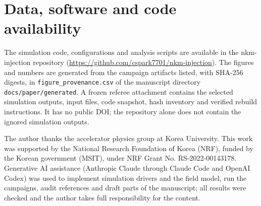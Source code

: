 \documentclass[aps,prab,reprint,amsmath,amssymb,floatfix,longbibliography]{revtex4-2}
\begin{document}
\section*{Data, software and code availability}

{\sloppy The simulation code, configurations and analysis scripts are available in the nkm-injection repository (\url{https://github.com/cspark7701/nkm-injection}). The figures and numbers are generated from the campaign artifacts listed, with SHA-256 digests, in \texttt{figure\_provenance.csv} of the manuscript directory \texttt{docs/\allowbreak paper/\allowbreak generated}. A frozen referee attachment contains the selected simulation outputs, input files, code snapshot, hash inventory and verified rebuild instructions. It has no public DOI; the repository alone does not contain the ignored simulation outputs.\par}

\begin{acknowledgments}

The author thanks the accelerator physics group at Korea University. This work was supported by the National Research Foundation of Korea (NRF), funded by the Korean government (MSIT), under NRF Grant No. RS-2022-00143178. Generative AI assistance (Anthropic Claude through Claude Code and OpenAI Codex) was used to implement simulation drivers and the field model, run the campaigns, audit references and draft parts of the manuscript; all results were checked and the author takes full responsibility for the content.

\end{acknowledgments}


\end{document}
